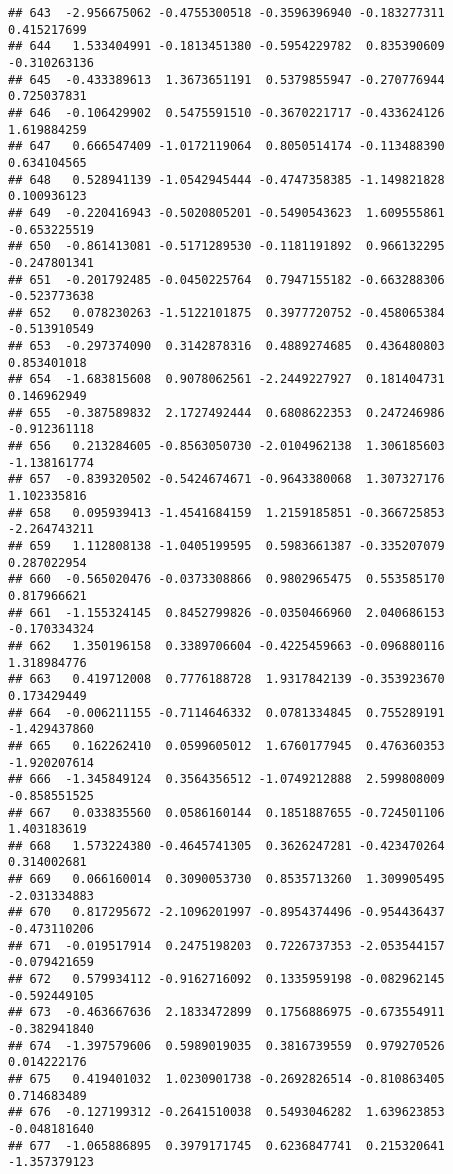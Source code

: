 \documentclass[
]{article}
\begin{document}
\begin{verbatim}
## 643  -2.956675062 -0.4755300518 -0.3596396940 -0.183277311  0.415217699
## 644   1.533404991 -0.1813451380 -0.5954229782  0.835390609 -0.310263136
## 645  -0.433389613  1.3673651191  0.5379855947 -0.270776944  0.725037831
## 646  -0.106429902  0.5475591510 -0.3670221717 -0.433624126  1.619884259
## 647   0.666547409 -1.0172119064  0.8050514174 -0.113488390  0.634104565
## 648   0.528941139 -1.0542945444 -0.4747358385 -1.149821828  0.100936123
## 649  -0.220416943 -0.5020805201 -0.5490543623  1.609555861 -0.653225519
## 650  -0.861413081 -0.5171289530 -0.1181191892  0.966132295 -0.247801341
## 651  -0.201792485 -0.0450225764  0.7947155182 -0.663288306 -0.523773638
## 652   0.078230263 -1.5122101875  0.3977720752 -0.458065384 -0.513910549
## 653  -0.297374090  0.3142878316  0.4889274685  0.436480803  0.853401018
## 654  -1.683815608  0.9078062561 -2.2449227927  0.181404731  0.146962949
## 655  -0.387589832  2.1727492444  0.6808622353  0.247246986 -0.912361118
## 656   0.213284605 -0.8563050730 -2.0104962138  1.306185603 -1.138161774
## 657  -0.839320502 -0.5424674671 -0.9643380068  1.307327176  1.102335816
## 658   0.095939413 -1.4541684159  1.2159185851 -0.366725853 -2.264743211
## 659   1.112808138 -1.0405199595  0.5983661387 -0.335207079  0.287022954
## 660  -0.565020476 -0.0373308866  0.9802965475  0.553585170  0.817966621
## 661  -1.155324145  0.8452799826 -0.0350466960  2.040686153 -0.170334324
## 662   1.350196158  0.3389706604 -0.4225459663 -0.096880116  1.318984776
## 663   0.419712008  0.7776188728  1.9317842139 -0.353923670  0.173429449
## 664  -0.006211155 -0.7114646332  0.0781334845  0.755289191 -1.429437860
## 665   0.162262410  0.0599605012  1.6760177945  0.476360353 -1.920207614
## 666  -1.345849124  0.3564356512 -1.0749212888  2.599808009 -0.858551525
## 667   0.033835560  0.0586160144  0.1851887655 -0.724501106  1.403183619
## 668   1.573224380 -0.4645741305  0.3626247281 -0.423470264  0.314002681
## 669   0.066160014  0.3090053730  0.8535713260  1.309905495 -2.031334883
## 670   0.817295672 -2.1096201997 -0.8954374496 -0.954436437 -0.473110206
## 671  -0.019517914  0.2475198203  0.7226737353 -2.053544157 -0.079421659
## 672   0.579934112 -0.9162716092  0.1335959198 -0.082962145 -0.592449105
## 673  -0.463667636  2.1833472899  0.1756886975 -0.673554911 -0.382941840
## 674  -1.397579606  0.5989019035  0.3816739559  0.979270526  0.014222176
## 675   0.419401032  1.0230901738 -0.2692826514 -0.810863405  0.714683489
## 676  -0.127199312 -0.2641510038  0.5493046282  1.639623853 -0.048181640
## 677  -1.065886895  0.3979171745  0.6236847741  0.215320641 -1.357379123

\end{verbatim}
\end{document}
